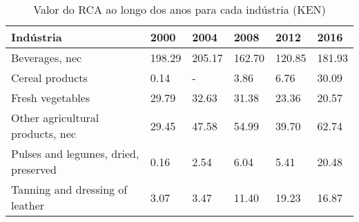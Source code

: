 \begin{table}
\centering
\caption{Valor do RCA ao longo dos anos para cada indústria (KEN)}
\begin{tabular}{p{6cm}p{1.5cm}p{1.5cm}p{1.5cm}p{1.5cm}p{1.5cm}}
\toprule
                           Indústria &   2000 &   2004 &   2008 &   2012 &   2016 \\
\midrule
                      Beverages, nec & 198.29 & 205.17 & 162.70 & 120.85 & 181.93 \\
                     Cereal products &   0.14 &      - &   3.86 &   6.76 &  30.09 \\
                    Fresh vegetables &  29.79 &  32.63 &  31.38 &  23.36 &  20.57 \\
    Other agricultural products, nec &  29.45 &  47.58 &  54.99 &  39.70 &  62.74 \\
Pulses and legumes, dried, preserved &   0.16 &   2.54 &   6.04 &   5.41 &  20.48 \\
     Tanning and dressing of leather &   3.07 &   3.47 &  11.40 &  19.23 &  16.87 \\
\bottomrule
\end{tabular}
\end{table}
